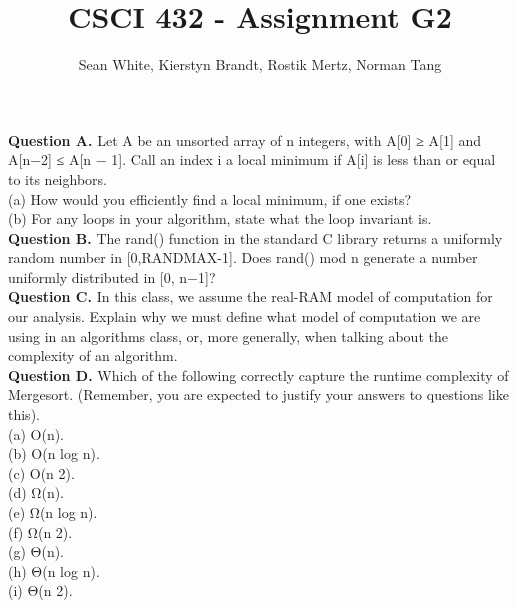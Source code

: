 \documentclass[12pt]{article}
\author{Sean White, Kierstyn Brandt, Rostik Mertz, Norman Tang}
\title{CSCI 432 - Assignment G2}
\begin{document}
\maketitle

\textbf{Question A.} Let A be an unsorted array of n integers, with A[0] ≥ A[1] and A[n−2] ≤ A[n − 1]. Call an index i a local minimum if A[i] is less than or equal to its neighbors.\\

(a) How would you efficiently find a local minimum, if one exists?\\

(b) For any loops in your algorithm, state what the loop invariant is.\\

\textbf{Question B.} The rand() function in the standard C library returns a uniformly random number in [0,RANDMAX-1]. Does rand() mod n generate a number uniformly distributed in [0, n−1]?\\

\textbf{Question C.} In this class, we assume the real-RAM model of computation for our analysis. Explain why we must define what model of computation we are using in an algorithms class, or, more generally, when talking about the complexity of an algorithm.\\

\textbf{Question D.} Which of the following correctly capture the runtime complexity of Mergesort. (Remember, you are expected to justify your answers to questions like this).\\

(a) O(n).\\

(b) O(n log n).\\

(c) O(n 2).\\

(d) Ω(n).\\

(e) Ω(n log n).\\

(f) Ω(n 2).\\

(g) Θ(n).\\

(h) Θ(n log n).\\

(i) Θ(n 2).\\
\end{document}
